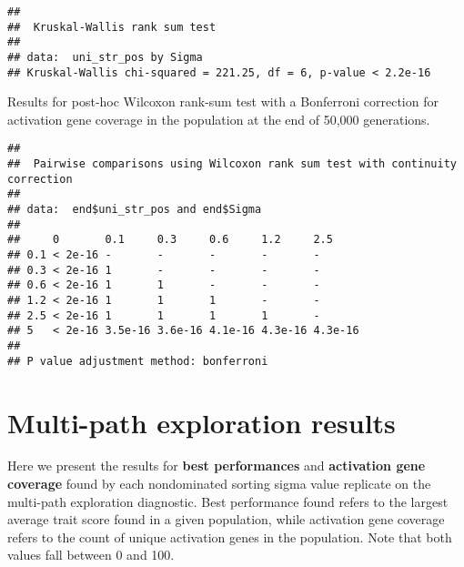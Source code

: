 \documentclass[]{book}
\newenvironment{Shaded}{\begin{snugshade}}{\end{snugshade}}
\newcommand{\DataTypeTok}[1]{\textcolor[rgb]{0.13,0.29,0.53}{#1}}
\newcommand{\KeywordTok}[1]{\textcolor[rgb]{0.13,0.29,0.53}{\textbf{#1}}}
\newcommand{\NormalTok}[1]{#1}
\newcommand{\OperatorTok}[1]{\textcolor[rgb]{0.81,0.36,0.00}{\textbf{#1}}}
\newcommand{\OtherTok}[1]{\textcolor[rgb]{0.56,0.35,0.01}{#1}}
\newcommand{\StringTok}[1]{\textcolor[rgb]{0.31,0.60,0.02}{#1}}
\begin{document}
\begin{verbatim}
## 
##  Kruskal-Wallis rank sum test
## 
## data:  uni_str_pos by Sigma
## Kruskal-Wallis chi-squared = 221.25, df = 6, p-value < 2.2e-16
\end{verbatim}

Results for post-hoc Wilcoxon rank-sum test with a Bonferroni correction for activation gene coverage in the population at the end of 50,000 generations.

\begin{Shaded}
\end{Shaded}

\begin{verbatim}
## 
##  Pairwise comparisons using Wilcoxon rank sum test with continuity correction 
## 
## data:  end$uni_str_pos and end$Sigma 
## 
##     0       0.1     0.3     0.6     1.2     2.5    
## 0.1 < 2e-16 -       -       -       -       -      
## 0.3 < 2e-16 1       -       -       -       -      
## 0.6 < 2e-16 1       1       -       -       -      
## 1.2 < 2e-16 1       1       1       -       -      
## 2.5 < 2e-16 1       1       1       1       -      
## 5   < 2e-16 3.5e-16 3.6e-16 4.1e-16 4.3e-16 4.3e-16
## 
## P value adjustment method: bonferroni
\end{verbatim}

\hypertarget{multi-path-exploration-results-5}{%
\section{Multi-path exploration results}\label{multi-path-exploration-results-5}}

Here we present the results for \textbf{best performances} and \textbf{activation gene coverage} found by each nondominated sorting sigma value replicate on the multi-path exploration diagnostic.
Best performance found refers to the largest average trait score found in a given population, while activation gene coverage refers to the count of unique activation genes in the population.
Note that both values fall between 0 and 100.
\end{document}
